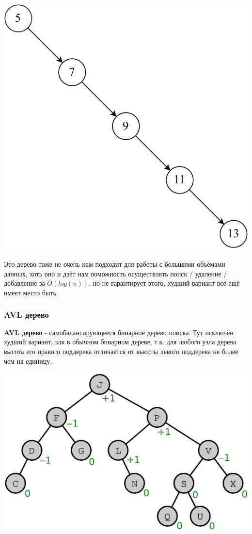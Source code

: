 \documentclass[utf8,14pt,a4paper,oneside,russian]{book}
\begin{document}
	\begin{center}
		\includegraphics[scale=1]{unbalanced_bin_tree}\\
	\end{center}
	
	Это дерево тоже не очень нам подходит для работы с большими объёмами данных, хоть оно и даёт нам воможность осуществлять поиск / удаление / добавление за $O(log(n))$, но не гарантирует этого, худший вариант всё ещё имеет место быть.
	
	\subsubsection{AVL дерево}

	\textbf{AVL дерево} - самобалансирующееся бинарное дерево поиска. Тут исключён худший вариант, как в обычном бинарном дереве, т.к.  для любого узла дерева высота его правого поддерева отличается от высоты левого поддерева не более чем на единицу.
	
	\begin{center}
		\includegraphics[scale=0.4]{avl_tree}\\
	\end{center}
	
\end{document}
